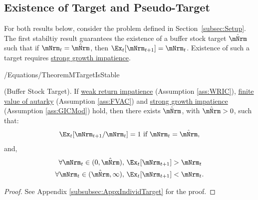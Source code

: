 \documentclass[\econtexRoot/BufferStockTheory]{subfiles}
\begin{document}

\hypertarget{onetarget}{}
\hypertarget{Unique-Stable-Points}{}


\subsection{Existence of Target and Pseudo-Target}\label{subsec:onetarget}\hypertarget{TheoremTarget}{}

For both results below, consider the problem defined in Section~\ref{subsec:Setup}.
The first stabiltiy result guarantees the existence of a buffer stock target $\mTrgNrm$ such that if $\mNrm_{t}=\mTrgNrm$, then $\Ex_{t}[\mNrm_{t+1}]=\mNrm_{t}$.
Existence of such a target requires \hyperlink{GICMod}{strong growth impatience}.

\begin{verbatimwrite}{\econtexRoot/Equations/TheoremMTargetIsStable}
  \begin{theorem}\label{thm:target} (Buffer Stock Target).
If \hyperlink{WRIC}{weak return impatience} (Assumption \ref{ass:WRIC}), \hyperlink{FVAC}{finite value of autarky} (Assumption \ref{ass:FVAC}) and \hyperlink{GICMod}{strong growth impatience} (Assumption \ref{ass:GICMod}) hold, then there exists $\mTrgNrm$, with $\mTrgNrm>0$, such that:
    \begin{equation}
      \Ex_t [{\mNrm}_{t+1}/\mNrm_t] = 1 \mbox{~if~} \mNrm_t = \mTrgNrm, 
      \label{eq:mTarget} %
    \end{equation}
    and, 
    \begin{equation}
      \label{eq:stability} %
      \begin{aligned}
        \forall {\mNrm}_t\in(0,\mTrgNrm),      \,\,& \Ex_t [{\mNrm}_{t+1}] > {\mNrm}_t  \\
        \forall {\mNrm}_t\in(\mTrgNrm,\infty), \,\,& \Ex_t [{\mNrm}_{t+1}] < {\mNrm}_t.
      \end{aligned}
    \end{equation}
  \end{theorem}
\end{verbatimwrite} \unskip


\begin{proof}\let\qed\relax
See Appendix \ref{subsubsec:AppxIndividTarget} for the proof.

\end{proof}
\end{document}
